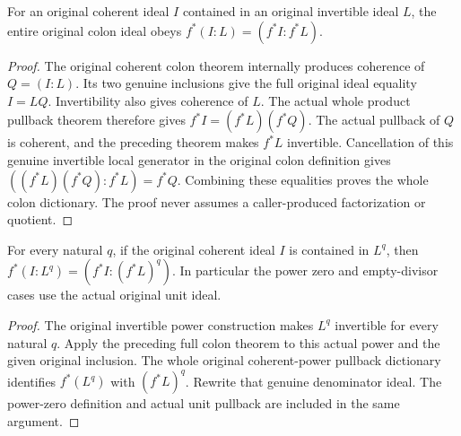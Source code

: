 \begin{theorem}\label{hir:submersion-actual-colon-ideal}
\leanok
For an original coherent ideal $I$ contained in an original invertible ideal $L$, the entire original colon ideal obeys $f^*(I:L)=(f^*I:f^*L)$.
\end{theorem}
\begin{proof}
The original coherent colon theorem internally produces coherence of $Q=(I:L)$. Its two genuine inclusions give the full original ideal equality $I=LQ$. Invertibility also gives coherence of $L$. The actual whole product pullback theorem therefore gives $f^*I=(f^*L)(f^*Q)$. The actual pullback of $Q$ is coherent, and the preceding theorem makes $f^*L$ invertible. Cancellation of this genuine invertible local generator in the original colon definition gives $((f^*L)(f^*Q):f^*L)=f^*Q$. Combining these equalities proves the whole colon dictionary. The proof never assumes a caller-produced factorization or quotient.
\end{proof}

\begin{theorem}\label{hir:submersion-actual-powered-colon}
\leanok
For every natural $q$, if the original coherent ideal $I$ is contained in $L^q$, then $f^*(I:L^q)=(f^*I:(f^*L)^q)$. In particular the power zero and empty-divisor cases use the actual original unit ideal.
\end{theorem}
\begin{proof}
The original invertible power construction makes $L^q$ invertible for every natural $q$. Apply the preceding full colon theorem to this actual power and the given original inclusion. The whole original coherent-power pullback dictionary identifies $f^*(L^q)$ with $(f^*L)^q$. Rewrite that genuine denominator ideal. The power-zero definition and actual unit pullback are included in the same argument.
\end{proof}

